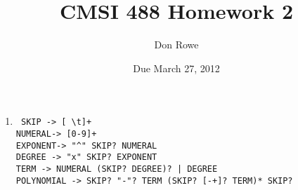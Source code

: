 \documentclass[landscape]{report}
\title{CMSI 488 Homework 2}
\author{Don Rowe}
\date{Due March 27, 2012}
\begin{document}
  \maketitle
  
  \begin{enumerate}
    \item %
    \texttt{
      SKIP -> [ \textbackslash t]+ \\
      NUMERAL-> [0-9]+ \\
      EXPONENT-> "\textasciicircum" SKIP? NUMERAL \\
      DEGREE -> "x" SKIP? EXPONENT \\
      TERM -> NUMERAL (SKIP? DEGREE)? | DEGREE \\
      POLYNOMIAL -> SKIP? "-"? TERM (SKIP? [-+]? TERM)* SKIP?
    }
  \end{enumerate}
\end{document}
